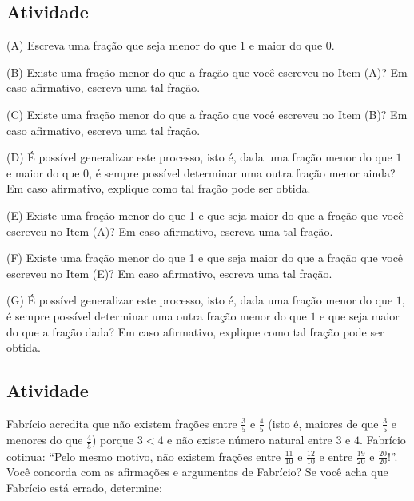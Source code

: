 \documentclass[a4,12pt]{book}
\begin{document}
\subsection{Atividade}








(A) Escreva uma fração que seja menor do que $1$ e maior do que $0$.

(B) Existe uma fração menor do que a fração que você escreveu no Item (A)? Em caso afirmativo, escreva uma tal fração.

(C) Existe uma fração menor do que a fração que você escreveu no Item (B)? Em caso afirmativo, escreva uma tal fração.

(D) É possível generalizar este processo, isto é, dada uma fração menor do que $1$ e maior do que $0$, é sempre possível determinar uma outra fração menor ainda? Em caso afirmativo, explique como tal fração pode ser obtida.

(E) Existe uma fração menor do que 1 e que seja maior do que a fração que você escreveu no Item (A)? Em caso afirmativo, escreva uma tal fração.

(F) Existe uma fração menor do que 1 e que seja maior do que a fração que você escreveu no Item (E)? Em caso afirmativo, escreva uma tal fração.

(G) É possível generalizar este processo, isto é, dada uma fração menor do que $1$, é sempre possível determinar uma outra fração menor do que $1$ e que seja maior do que a fração dada? Em caso afirmativo, explique como tal fração pode ser obtida.






\subsection{Atividade}







Fabrício acredita que não existem frações entre $\frac{3}{5}$ e $\frac{4}{5}$ (isto é, maiores de que $\frac{3}{5}$ e menores do que $\frac{4}{5}$) porque $3 < 4$ e não existe número natural entre $3$ e $4$. Fabrício cotinua: ``Pelo mesmo motivo, não existem frações entre $\frac{11}{10}$ e $\frac{12}{10}$ e entre $\frac{19}{20}$ e $\frac{20}{20}$!''. Você concorda com as afirmações e argumentos de Fabrício? Se você acha que Fabrício está errado, determine:
\end{document}
